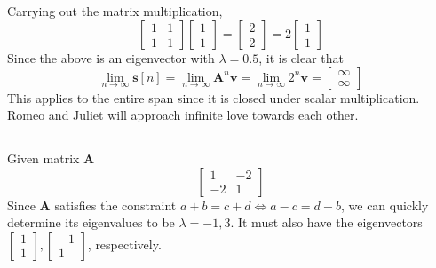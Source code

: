 \documentclass[]{article}
\numberwithin{equation}{section}
\begin{document}
\subsection{}

Carrying out the matrix multiplication, 
\begin{equation}
	\begin{bmatrix}
	1 & 1 \\
	1 & 1
	\end{bmatrix}
	\begin{bmatrix}
	1 \\
	1
	\end{bmatrix}
	=
	\begin{bmatrix}
	2 \\
	2
	\end{bmatrix}
	=
	2\begin{bmatrix}
	1 \\
	1
	\end{bmatrix}
\end{equation}
Since the above is an eigenvector with \(\lambda = 0.5\), it is clear that 
\begin{equation}
	\lim_{n \to \infty} \mathbf{s}[n] = \lim_{n \to \infty} \mathbf{A}^n \mathbf{v} = \lim_{n \to \infty} 2^n \mathbf{v} = \begin{bmatrix}
	\infty \\
	\infty
	\end{bmatrix}
\end{equation}
This applies to the entire span since it is closed under scalar multiplication. 
Romeo and Juliet will approach infinite love towards each other. 

\subsection{}

Given matrix \(\mathbf{A}\)
\begin{equation}
	\begin{bmatrix}
	1 & -2 \\
	-2 & 1
	\end{bmatrix}
\end{equation}
Since \(\mathbf{A}\) satisfies the constraint \(a + b = c + d \Leftrightarrow a - c = d - b\), we can quickly determine its eigenvalues to be \(\lambda = -1, 3\). It must also have the eigenvectors \(\begin{bmatrix}
1 \\
1
\end{bmatrix}, \begin{bmatrix}
-1 \\
1
\end{bmatrix}\), respectively. 
\end{document}
